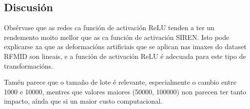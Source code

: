 




\subsection{Discusión}
\label{subsec:Discusion-batchsize}

Obsérvase que as redes ca función de activación ReLU tenden a ter un rendemento moito mellor que as ca función de activación SIREN. Isto pode explicarse xa que as deformacións artificiais que se aplican nas imaxes do dataset RFMID son lineais, e a función de activación ReLU é adecuada para este tipo de transformacións.

Tamén parece que o tamaño de lote é relevante, especialmente o cambio entre 1000 e 10000, mentres que valores maiores (50000, 100000) non parecen ter tanto impacto, aínda que si un maior custo computacional. 

